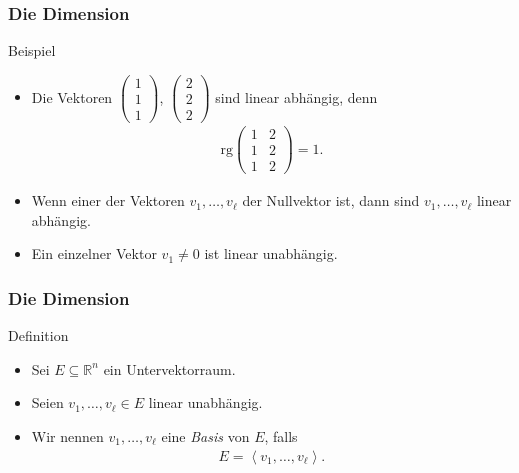 \documentclass{beamer}
\renewcommand{\emph}[1]{{\textcolor{solarizedRed}{\itshape #1}}}
\newcommand\RR{\mathbb R}
\newcommand{\bck}[1]{\left\langle{#1}\right\rangle}
\renewcommand{\ae}{\"a}
\newcommand{\rk}{\mathrm{rg}}
\newcommand{\mytitle}{Die Dimension}
\begin{document}
\begin{frame}\frametitle{\mytitle}
	\begin{block}{Beispiel}
		\begin{itemize}
			\item Die Vektoren $\begin{pmatrix} 1\\1\\1 \end{pmatrix}$, $\begin{pmatrix} 2\\2\\2 \end{pmatrix}$ sind linear abh\ae ngig, denn
				\begin{align*}
					\rk\begin{pmatrix}1&2\\1&2\\1&2\end{pmatrix}=1.
				\end{align*}
			\item Wenn einer der Vektoren $v_1,\ldots,v_\ell$ der Nullvektor ist, dann sind $v_1,\ldots,v_\ell$ linear abh\ae ngig.
			\item Ein einzelner Vektor $v_1\neq0$ ist linear unabh\ae ngig.
		\end{itemize}
	\end{block}
\end{frame}

\begin{frame}\frametitle{\mytitle}
	\begin{block}{Definition}
		\begin{itemize}
			\item Sei $E\subseteq\RR^n$ ein Untervektorraum.
			\item Seien $v_1,\ldots,v_\ell\in E$ linear unabh\ae ngig.
			\item Wir nennen $v_1,\ldots,v_\ell$ eine \emph{Basis} von $E$, falls
				\begin{align*}
					E=\bck{v_1,\ldots,v_\ell}.
				\end{align*}
		\end{itemize}
	\end{block}
\end{frame}
\end{document}
